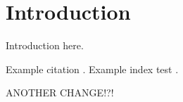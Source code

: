 \chapter{Introduction}
Introduction here. 

Example citation \cite{Blame}.
Example index test .\par  
ANOTHER CHANGE!?!
